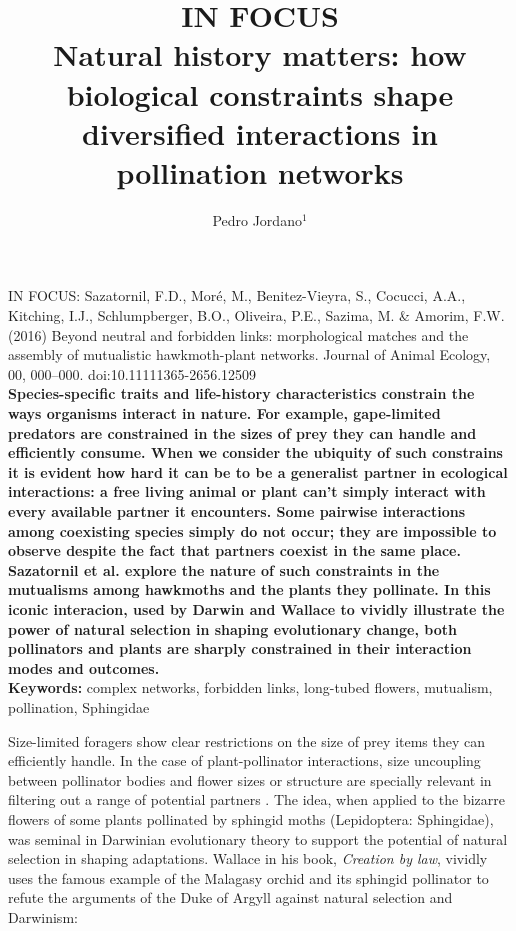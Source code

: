 \documentclass[a4paper,12pt]{article}
\title{IN FOCUS \\ Natural history matters: how biological constraints shape diversified interactions in pollination networks}
\author{Pedro Jordano$^{1}$}
\begin{document}
\maketitle

  \noindent 
  IN FOCUS: Sazatornil, F.D., Moré, M., Benitez-Vieyra, S., Cocucci, A.A., Kitching, I.J., Schlumpberger, B.O., Oliveira, P.E., Sazima, M. \& Amorim, F.W. (2016) Beyond neutral and forbidden links: morphological matches and the assembly of mutualistic hawkmoth-plant networks. Journal of Animal Ecology, 00, 000–000. doi:10.1111\/1365-2656.12509 \\
  
  \textbf{Species-specific traits and life-history characteristics constrain the ways organisms interact in nature. For example, gape-limited predators are constrained in the sizes of prey they can handle and efficiently consume. When we consider the ubiquity of such constrains it is evident how hard it can be to be a generalist partner in ecological interactions: a free living animal or plant can't simply interact with every available partner it encounters. Some pairwise interactions among coexisting species simply do not occur; they are impossible to observe despite the fact that partners coexist in the same place. Sazatornil et al. explore the nature of such constraints in the mutualisms among hawkmoths and the plants they pollinate. In this iconic interacion, used by Darwin and Wallace to vividly illustrate the power of natural selection in shaping evolutionary change, both pollinators and plants are sharply constrained in their interaction modes and outcomes. } \\

\noindent \textbf{Keywords:} complex networks, forbidden links, long-tubed flowers, mutualism, pollination, Sphingidae

\newpage

Size-limited foragers show clear restrictions on the size of prey items they can efficiently handle. In the case of plant-pollinator interactions, size uncoupling between pollinator bodies and flower sizes or structure are specially relevant in filtering out a range of potential partners \citep{Cocucci:2009}. The idea, when applied to the bizarre flowers of some plants pollinated by sphingid moths (Lepidoptera: Sphingidae), was seminal in Darwinian evolutionary theory to support the potential of natural selection in shaping adaptations. Wallace \citep{Wallace:1867} in his book, \textit{Creation by law}, vividly uses the famous example of the Malagasy orchid and its sphingid pollinator to refute the arguments of the Duke of Argyll against natural selection and Darwinism:
\end{document}
